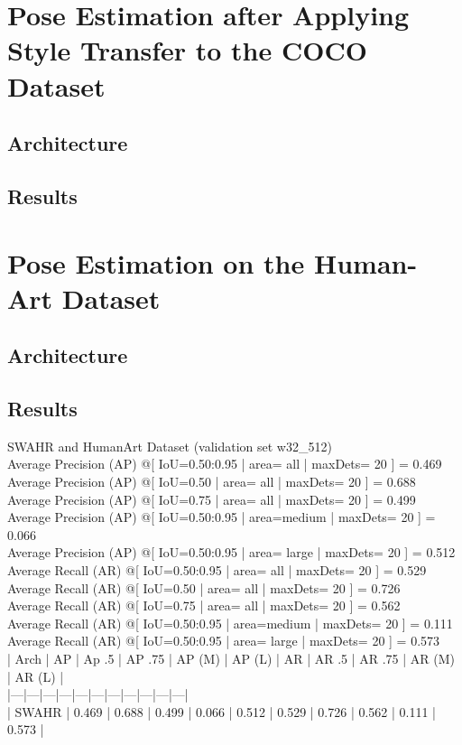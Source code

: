 \section{Pose Estimation after Applying Style Transfer to the COCO Dataset}
\label{sec:baseline_coco_style_transfer}

\subsection{Architecture}
\label{sec:baseline_coco_style_transfer_architecture}

\subsection{Results}
\label{sec:baseline_coco_style_transfer_results}

\section{Pose Estimation on the Human-Art Dataset}
\label{sec:baseline_human_art}

\subsection{Architecture}
\label{sec:baseline_human_art_architecture}

\subsection{Results}
\label{sec:baseline_human_art_results}

SWAHR and HumanArt Dataset (validation set w32\_512)\\
Average Precision  (AP) @[ IoU=0.50:0.95 | area=   all | maxDets= 20 ] = 0.469\\
 Average Precision  (AP) @[ IoU=0.50      | area=   all | maxDets= 20 ] = 0.688\\
 Average Precision  (AP) @[ IoU=0.75      | area=   all | maxDets= 20 ] = 0.499\\
 Average Precision  (AP) @[ IoU=0.50:0.95 | area=medium | maxDets= 20 ] = 0.066\\
 Average Precision  (AP) @[ IoU=0.50:0.95 | area= large | maxDets= 20 ] = 0.512\\
 Average Recall     (AR) @[ IoU=0.50:0.95 | area=   all | maxDets= 20 ] = 0.529\\
 Average Recall     (AR) @[ IoU=0.50      | area=   all | maxDets= 20 ] = 0.726\\
 Average Recall     (AR) @[ IoU=0.75      | area=   all | maxDets= 20 ] = 0.562\\
 Average Recall     (AR) @[ IoU=0.50:0.95 | area=medium | maxDets= 20 ] = 0.111\\
 Average Recall     (AR) @[ IoU=0.50:0.95 | area= large | maxDets= 20 ] = 0.573\\
| Arch | AP | Ap .5 | AP .75 | AP (M) | AP (L) | AR | AR .5 | AR .75 | AR (M) | AR (L) |\\
|---|---|---|---|---|---|---|---|---|---|---|\\
| SWAHR | 0.469 | 0.688 | 0.499 | 0.066 | 0.512 | 0.529 | 0.726 | 0.562 | 0.111 | 0.573 |\\

